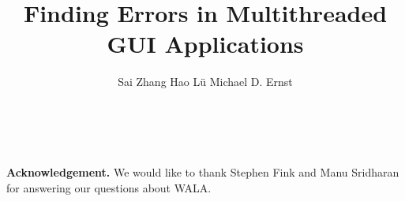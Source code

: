 \documentclass{sig-alternate}
\begin{document}
\title{Finding Errors in Multithreaded GUI Applications}


\author{
\alignauthor Sai Zhang \quad Hao L\"u \quad Michael D. Ernst\\
       \\
       \\
}


\maketitle

















\vspace{2mm}

\noindent \textbf{Acknowledgement.} We would like
to thank Stephen Fink and Manu Sridharan for
answering our questions about WALA.
\vspace{-2mm}


\small{

}
\end{document}

